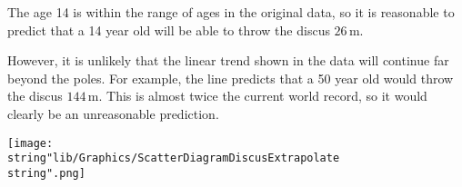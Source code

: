 \documentclass[11pt,a4paper]{book}
\begin{document}
\begin{minipage}{.45\textwidth}

The age 14 is within the range of ages in the original data, so it
is reasonable to predict that a 14 year old will be able to throw
the discus $26\,\text{m}$.

\medskip

However, it is unlikely that the linear trend shown in the data will
continue far beyond the poles. For example, the line predicts that
a 50 year old would throw the discus $144\,\text{m}$. This is almost
twice the current world record, so it would clearly be an unreasonable
prediction.

\end{minipage}
\begin{minipage}{.54\textwidth}
\begin{center}
\texttt{[image: \\string"lib/Graphics/ScatterDiagramDiscusExtrapolate\\string".png]}
\par\end{center}

\end{minipage}

\newpage{}
\end{document}
